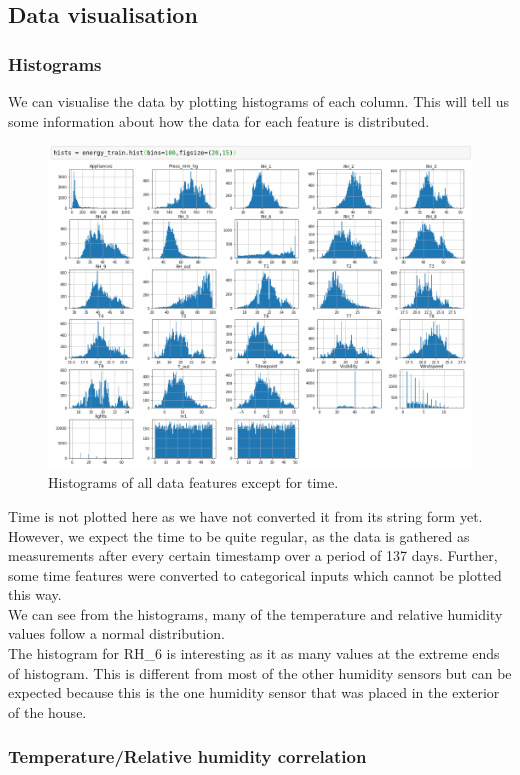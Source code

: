\documentclass{article}
\newcommand{\n}[0]{\\[\baselineskip]}
\begin{document}
\subsection{Data visualisation}

\subsubsection{Histograms}
We can visualise the data by plotting histograms of each column. This will tell us some information about how the data for each feature is distributed.

\begin{figure}[H]
\centering
\includegraphics[width=1\textwidth, keepaspectratio]{imgs/histograms.png}
\caption{Histograms of all data features except for time.}
\end{figure}
\noindent
Time is not plotted here as we have not converted it from its string form yet. However, we expect the time to be quite regular, as the data is gathered as measurements after every certain timestamp over a period of 137 days. Further, some time features were converted to categorical inputs which cannot be plotted this way.
\n
We can see from the histograms, many of the temperature and relative humidity values follow a normal distribution. 
\n
The histogram for RH\_6 is interesting as it as many values at the extreme ends of histogram. This is different from most of the other humidity sensors but can be expected because this is the one humidity sensor that was placed in the exterior of the house. 

\subsubsection{Temperature/Relative humidity correlation}
\end{document}
